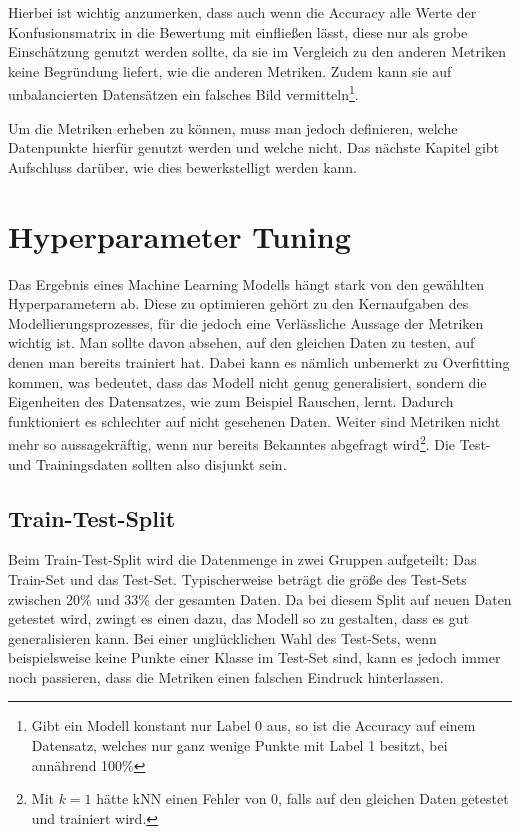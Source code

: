 Hierbei ist wichtig anzumerken, dass auch wenn die Accuracy alle Werte der Konfusionsmatrix in die Bewertung
 mit einfließen lässt, diese nur als grobe Einschätzung genutzt werden sollte, da sie im Vergleich zu den anderen
 Metriken keine Begründung liefert, wie die anderen Metriken. Zudem kann sie auf unbalancierten Datensätzen ein
 falsches Bild vermitteln\footnote{Gibt ein Modell konstant nur Label 0 aus, so ist die Accuracy auf einem
 Datensatz, welches nur ganz wenige Punkte mit Label 1 besitzt, bei annährend 100\%}.

Um die Metriken erheben zu können, muss man jedoch definieren, welche Datenpunkte hierfür genutzt werden
 und welche nicht. Das nächste Kapitel gibt Aufschluss darüber, wie dies bewerkstelligt werden kann.


\section{Hyperparameter Tuning \label{Section-HyperTuning}}

Das Ergebnis eines Machine Learning Modells hängt stark von den gewählten Hyperparametern ab. Diese zu
 optimieren gehört zu den Kernaufgaben des Modellierungsprozesses, für die jedoch eine Verlässliche Aussage
 der Metriken wichtig ist. Man sollte davon absehen, auf den gleichen Daten zu testen, auf denen man bereits
 trainiert hat. Dabei kann es nämlich unbemerkt zu Overfitting kommen, was bedeutet, dass das Modell nicht
 genug generalisiert, sondern die Eigenheiten des Datensatzes, wie zum Beispiel Rauschen, lernt. Dadurch
 funktioniert es schlechter auf nicht gesehenen Daten. Weiter sind Metriken nicht mehr so aussagekräftig,
 wenn nur bereits Bekanntes abgefragt wird\footnote{Mit $k=1$ hätte kNN einen Fehler von $0$, falls auf den
 gleichen Daten getestet und trainiert wird.}. Die Test- und Trainingsdaten sollten also disjunkt sein.

\subsection*{Train-Test-Split}

Beim Train-Test-Split wird die Datenmenge in zwei Gruppen aufgeteilt: Das Train-Set und das Test-Set.
 Typischerweise beträgt die größe des Test-Sets zwischen 20\% und 33\% der gesamten Daten. Da bei diesem Split
 auf neuen Daten getestet wird, zwingt es einen dazu, das Modell so zu gestalten, dass es gut generalisieren
 kann. Bei einer unglücklichen Wahl des Test-Sets, wenn beispielsweise keine Punkte einer Klasse im Test-Set sind,
 kann es jedoch immer noch passieren, dass die Metriken einen falschen Eindruck hinterlassen.

